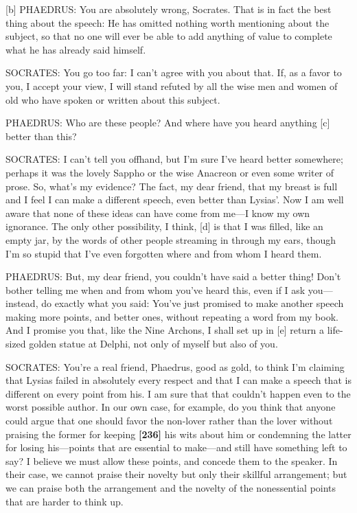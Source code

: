 {[}b{]} PHAEDRUS: You are absolutely wrong, Socrates. That is in fact
the best thing about the speech: He has omitted nothing worth mentioning
about the subject, so that no one will ever be able to add anything of
value to complete what he has already said himself.

SOCRATES: You go too far: I can't agree with you about that. If, as a
favor to you, I accept your view, I will stand refuted by all the wise
men and women of old who have spoken or written about this subject.

PHAEDRUS: Who are these people? And where have you heard anything
{[}c{]} better than this?

SOCRATES: I can't tell you offhand, but I'm sure I've heard better
somewhere; perhaps it was the lovely Sappho or the wise Anacreon or even
some writer of prose. So, what's my evidence? The fact, my dear friend,
that my breast is full and I feel I can make a different speech, even
better than Lysias'. Now I am well aware that none of these ideas can
have come from me---I know my own ignorance. The only other possibility,
I think, {[}d{]} is that I was filled, like an empty jar, by the words
of other people streaming in through my ears, though I'm so stupid that
I've even forgotten where and from whom I heard them.

PHAEDRUS: But, my dear friend, you couldn't have said a better thing!
Don't bother telling me when and from whom you've heard this, even if I
ask you---instead, do exactly what you said: You've just promised to
make another speech making more points, and better ones, without
repeating a word from my book. And I promise you that, like the Nine
Archons, I shall set up in {[}e{]} return a life-sized golden statue at
Delphi, not only of myself but also of
you.

SOCRATES: You're a real friend, Phaedrus, good as gold, to think I'm
claiming that Lysias failed in absolutely every respect and that I can
make a speech that is different on every point from his. I am sure that
that couldn't happen even to the worst possible author. In our own case,
for example, do you think that anyone could argue that one should favor
the non-lover rather than the lover without praising the former for
keeping {\bf {[}236{]}} his wits about him or condemning the latter for
losing his---points that are essential to make---and still have
something left to say? I believe we must allow these points, and concede
them to the speaker. In their case, we cannot praise their novelty but
only their skillful arrangement; but we can praise both the arrangement
and the novelty of the nonessential points that are harder to think up.

